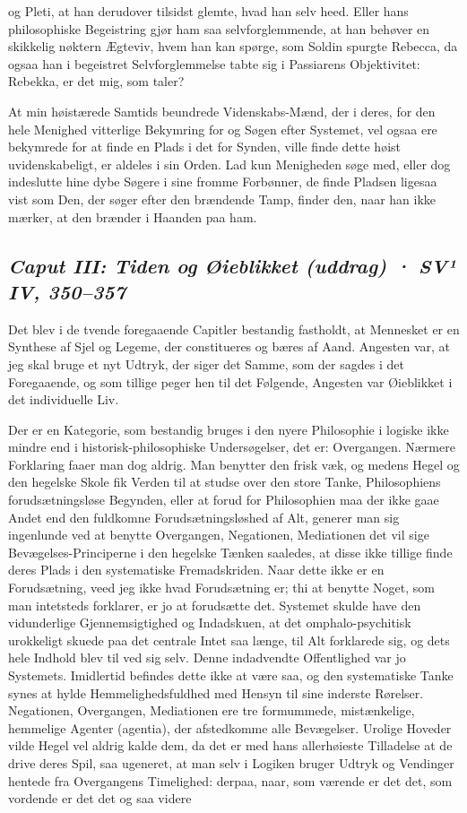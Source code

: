 \documentclass[12pt,a4paper]{article}
\newcommand{\sectionheading}[1]{\subsection*{\normalfont\itshape #1}}
\begin{document}
og Pleti, at han derudover tilsidst glemte, hvad han selv heed. Eller hans philosophiske Begeistring gjør ham saa selvforglemmende, at han behøver en skikkelig nøktern Ægteviv, hvem han kan spørge, som Soldin spurgte Rebecca, da ogsaa han i begeistret Selvforglemmelse tabte sig i Passiarens Objektivitet: Rebekka, er det mig, som taler?

At min høistærede Samtids beundrede Videnskabs-Mænd, der i deres, for den hele Menighed vitterlige Bekymring for og Søgen efter Systemet, vel ogsaa ere bekymrede for at finde en Plads i det for Synden, ville finde dette høist uvidenskabeligt, er aldeles i sin Orden. Lad kun Menigheden søge med, eller dog indeslutte hine dybe Søgere i sine fromme Forbønner, de finde Pladsen ligesaa vist som Den, der søger efter den brændende Tamp, finder den, naar han ikke mærker, at den brænder i Haanden paa ham.

\sectionheading{Caput III: Tiden og Øieblikket (uddrag)  ·  SV¹ IV, 350–357}

Det blev i de tvende foregaaende Capitler bestandig fastholdt, at Mennesket er en Synthese af Sjel og Legeme, der constitueres og bæres af Aand. Angesten var, at jeg skal bruge et nyt Udtryk, der siger det Samme, som der sagdes i det Foregaaende, og som tillige peger hen til det Følgende, Angesten var Øieblikket i det individuelle Liv.

Der er en Kategorie, som bestandig bruges i den nyere Philosophie i logiske ikke mindre end i historisk-philosophiske Undersøgelser, det er: Overgangen. Nærmere Forklaring faaer man dog aldrig. Man benytter den frisk væk, og medens Hegel og den hegelske Skole fik Verden til at studse over den store Tanke, Philosophiens forudsætningsløse Begynden, eller at forud for Philosophien maa der ikke gaae Andet end den fuldkomne Forudsætningsløshed af Alt, generer man sig ingenlunde ved at benytte Overgangen, Negationen, Mediationen det vil sige Bevægelses-Principerne i den hegelske Tænken saaledes, at disse ikke tillige finde deres Plads i den systematiske Fremadskriden. Naar dette ikke er en Forudsætning, veed jeg ikke hvad Forudsætning er; thi at benytte Noget, som man intetsteds forklarer, er jo at forudsætte det. Systemet skulde have den vidunderlige Gjennemsigtighed og Indadskuen, at det omphalo-psychitisk urokkeligt skuede paa det centrale Intet saa længe, til Alt forklarede sig, og dets hele Indhold blev til ved sig selv. Denne indadvendte Offentlighed var jo Systemets. Imidlertid befindes dette ikke at være saa, og den systematiske Tanke synes at hylde Hemmelighedsfuldhed med Hensyn til sine inderste Rørelser. Negationen, Overgangen, Mediationen ere tre formummede, mistænkelige, hemmelige Agenter (agentia), der afstedkomme alle Bevægelser. Urolige Hoveder vilde Hegel vel aldrig kalde dem, da det er med hans allerhøieste Tilladelse at de drive deres Spil, saa ugeneret, at man selv i Logiken bruger Udtryk og Vendinger hentede fra Overgangens Timelighed: derpaa, naar, som værende er det det, som vordende er det det og saa videre
\end{document}

